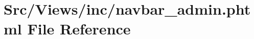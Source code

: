 \hypertarget{navbar__admin_8phtml}{}\section{Src/\+Views/inc/navbar\+\_\+admin.phtml File Reference}
\label{navbar__admin_8phtml}
